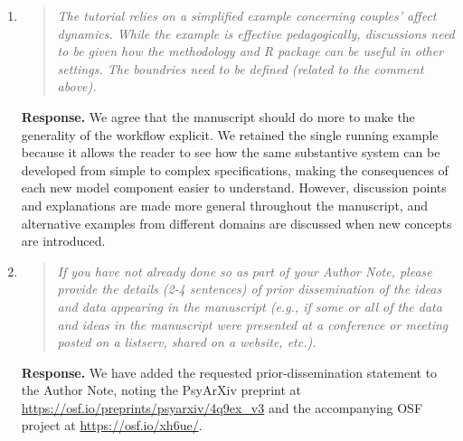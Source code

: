 \documentclass[11pt]{article}
\newcommand{\response}{\textbf{Response.} }
\newcommand{\secit}[1]{\textit{[#1]}}
\newcommand{\msq}[1]{\begin{quote}\small\noindent``#1''\end{quote}}
\newenvironment{reviewerpoint}{\begin{quote}\itshape}{\end{quote}}
\begin{document}
\begin{enumerate}[label=\textbf{Editor Comment \arabic*.}]
\response We agree and have added \secit{Boundary Conditions} near the outset.
The tutorial now states more clearly when continuous-time models are appropriate and when simpler alternatives may be preferable:
\msq{They are not automatically preferable, however.
Simpler descriptive, mixed-effects, or discrete-time models may be better choices when the research question is not dynamic, when the time scale is not theoretically meaningful, when measurements are too sparse or unreliable to identify the proposed dynamics, or when the parameters of a more complex model would not be substantively interpretable.}

We also clarified in the same section that model complexity should be calibrated in both directions---models can be too complex for the data, but also too simple when distinct influences are bundled into one parameter.
The discussion also notes data density, measurement quality, irregular timing, missingness, nonstationarity, floor or ceiling effects, non-Gaussian outcomes, and common estimation failures.
\item

\begin{reviewerpoint}
The tutorial relies on a simplified example concerning couples' affect dynamics.
While the example is effective pedagogically, discussions need to be given how the methodology and R package can be useful in other settings.
The boundries need to be defined (related to the comment above).
\end{reviewerpoint}

\response We agree that the manuscript should do more to make the generality of the workflow explicit.
We retained the single running example because it allows the reader to see how the same substantive system can be developed from simple to complex specifications, making the consequences of each new model component easier to understand.
However, discussion points and explanations are made more general throughout the manuscript, and alternative examples from different domains are discussed when new concepts are introduced.
\item

\begin{reviewerpoint}
If you have not already done so as part of your Author Note, please provide the details (2-4 sentences) of prior dissemination of the ideas and data appearing in the manuscript (e.g., if some or all of the data and ideas in the manuscript were presented at a conference or meeting posted on a listserv, shared on a website, etc.).
\end{reviewerpoint}

\response We have added the requested prior-dissemination statement to the Author Note, noting the PsyArXiv preprint at \url{https://osf.io/preprints/psyarxiv/4q9ex_v3} and the accompanying OSF project at \url{https://osf.io/xh6ue/}.
\end{enumerate}
\end{document}
